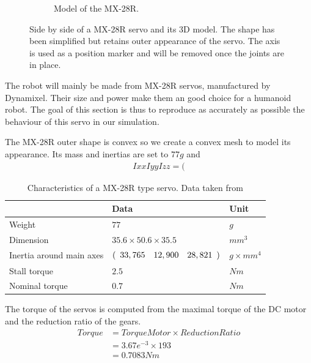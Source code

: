 \begin{figure}[htp]
\begin{subfigure}[b]{0.3\textwidth}
    \caption{Model of the MX-28R.}
    \label{fig:mx28_model}
\end{subfigure}
\caption{Side by side of a MX-28R servo and its 3D model. The shape has been simplified but retains outer appearance of the servo. The axis is used as a position marker and will be removed once the joints are in place.}
\label{fig:servo}
\end{figure}

The robot will mainly be made from MX-28R servos, manufactured by Dynamixel. Their size and power make them an good choice for a humanoid robot. The goal of this section is thus to reproduce as accurately as possible the behaviour of this servo in our simulation.

The MX-28R outer shape is convex so we create a convex mesh to model its appearance. Its mass and inertias are set to $77g$ and 
\begin{align*}
Ixx Iyy Izz = (
\end{align*}

\begin{table}[htp]
\center
\begin{tabularx}{\textwidth}{@{} l l l @{}}
\toprule
& \textbf{Data} & \textbf{Unit}\\ 
\midrule
Weight & $77$ & $g$\\
Dimension & $35.6 \times 50.6 \times 35.5$ & $mm^3$\\
Inertia around main axes & $(\begin{array}{c c c}
33,765 & 12,900 & 28,821
\end{array})$ & $g \times mm^4$ \\
Stall torque & $2.5$ & $Nm$\\
Nominal torque & $0.7$ & $Nm$\\
\bottomrule
\end{tabularx}
\caption{Characteristics of a MX-28R type servo. Data taken from \cite{mx_28_manual}}
\label{table:specs}
\end{table}

The torque of the servos is computed from the maximal torque of the DC motor and the reduction ratio of the gears. 
\begin{align*}
Torque &= TorqueMotor \times ReductionRatio\\
&= 3.67e^{-3} \times 193\\
&= 0.7083Nm
\end{align*} 

